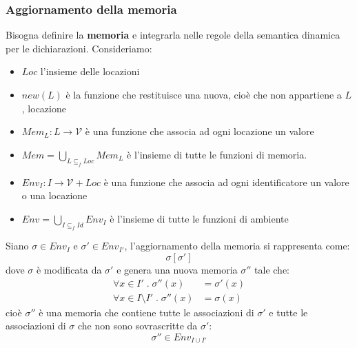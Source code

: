 \documentclass[a4paper]{article}
\begin{document}
\subsubsection{Aggiornamento della memoria}
Bisogna definire la \textbf{memoria} e integrarla nelle regole della semantica dinamica
per le dichiarazioni. Consideriamo:
\begin{itemize}
  \item \( Loc \) l'insieme delle locazioni

  \item \( new(L) \) è la funzione che restituisce una nuova, cioè che non appartiene
    a \( L \), locazione

  \item \( Mem_L: L \to \mathcal{V} \) è una funzione che associa ad ogni locazione un
    valore

  \item \( Mem = \bigcup_{L \subseteq_f Loc} Mem_L \) è l'insieme di tutte le funzioni
    di memoria.

  \item \( Env_I: I \to \mathcal{V} + Loc \) è una funzione che associa ad ogni
    identificatore un valore o una locazione

  \item \( Env = \bigcup_{I \subseteq_f Id} Env_I \) è l'insieme di tutte le funzioni
    di ambiente
\end{itemize}

\noindent
Siano \( \sigma  \in Env_I \) e \( \sigma' \in Env_{I'} \),
l'aggiornamento della memoria si rappresenta come:
\[
  \sigma[\sigma']
\] 
dove \( \sigma \) è modificata da \( \sigma' \) e genera una nuova memoria \( \sigma'' \)
tale che:
\[
  \begin{aligned}
    \forall x \in I' \;.\; \sigma''(x) & = \sigma'(x) \\
    \forall x \in I \setminus I' \;.\; \sigma''(x) & = \sigma(x)
  \end{aligned}
\] 
cioè \( \sigma'' \) è una memoria che contiene tutte le associazioni di \( \sigma' \) e
tutte le associazioni di \( \sigma \) che non sono sovrascritte da \( \sigma' \):
\[
  \sigma'' \in Env_{I \cup I'}
\] 
\end{document}
